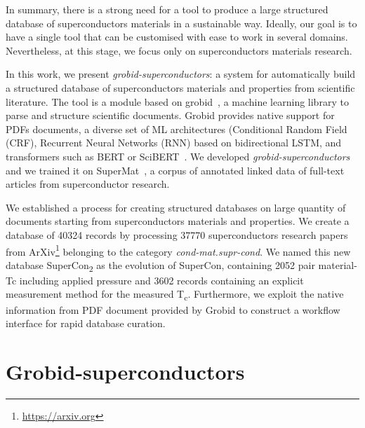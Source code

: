 \documentclass{article}
\begin{document}
In summary, there is a strong need for a tool to produce a large structured database of superconductors materials in a sustainable way. 
Ideally, our goal is to have a single tool that can be customised with ease to work in several domains. Nevertheless, at this stage, we focus only on superconductors materials research. 

In this work, we present \textit{grobid-superconductors}: a system for automatically build a structured database of superconductors materials and properties from scientific literature. 
The tool is a module based on grobid~\cite{GROBID}, a machine learning library to parse and structure scientific documents. Grobid provides native support for PDFs documents, a diverse set of ML architectures (Conditional Random Field (CRF), Recurrent Neural Networks (RNN) based on bidirectional LSTM, and transformers such as BERT\cite{devlin2018bert} or SciBERT~\cite{Beltagy2019SciBERT}. 
We developed \textit{grobid-superconductors} and we trained it on SuperMat~\cite{foppiano2021supermat}, a corpus of annotated linked data of full-text articles from superconductor research.

We established a process for creating structured databases on large quantity of documents starting from superconductors materials and properties. 
We create a database of 40324 records by processing 37770 superconductors research papers from ArXiv\footnote{\url{https://arxiv.org}} belonging to the category \textit{cond-mat.supr-cond}. We named this new database SuperCon\textsubscript{2} as the evolution of SuperCon, containing 2052 pair material-Tc including applied pressure and 3602 records containing an explicit measurement method for the measured T\textsubscript{c}.
Furthermore, we exploit the native information from PDF document provided by Grobid to construct a workflow interface for rapid database curation. 


\section{Grobid-superconductors}
\end{document}
